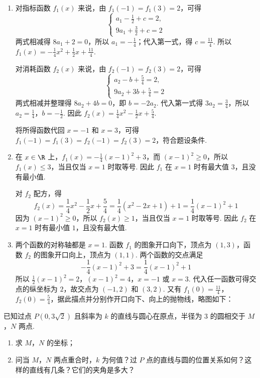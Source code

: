 \begin{solution}
\begin{enumerate}
\item 对指标函数 \( f_1(x) \) 来说，由 \( f_1(-1)=f_1(3)=2 \)，可得
\[
\begin{cases}
a_1-\frac{1}{2}+c=2,\\
9a_1+\frac{3}{2}+c=2
\end{cases}
\]
两式相减得 \(8a_1+2=0\)，所以 \(a_1=-\frac14\)；代入第一式，得 \(c=\frac{11}{4}\). 所以
\(f_1(x)=-\frac14x^2+\frac12x+\frac{11}{4}\).

对消耗函数 \( f_2(x) \) 来说，由 \( f_2(-1)=f_2(3)=2 \)，可得
\[
\begin{cases}
a_2-b+\frac{5}{4}=2,\\
9a_2+3b+\frac{5}{4}=2
\end{cases}
\]
两式相减并整理得 \(8a_2+4b=0\)，即 \(b=-2a_2\). 代入第一式得 \(3a_2=\frac34\)，所以 \(a_2=\frac14\)，\(b=-\frac12\). 因此
\(f_2(x)=\frac14x^2-\frac12x+\frac54\).

将所得函数代回 \(x=-1\) 和 \(x=3\)，可得
\(f_1(-1)=f_1(3)=f_2(-1)=f_2(3)=2\)，符合题设条件.

\item 在 \(x\in\R\) 上，\(f_1(x)=-\frac14(x-1)^2+3\)，而 \((x-1)^2\geq0\)，所以 \(f_1(x)\leq3\)，当且仅当 \(x=1\) 时取等号. 因此 \(f_1\) 在 \(x=1\) 时有最大值 \(3\)，且没有最小值.

对 \(f_2\) 配方，得
\[
f_2(x)=\frac14x^2-\frac12x+\frac54
=\frac14\left(x^2-2x+1\right)+1
=\frac14(x-1)^2+1
\]
因为 \((x-1)^2\geq0\)，所以 \(f_2(x)\geq1\)，当且仅当 \(x=1\) 时取等号. 因此 \(f_2\) 在 \(x=1\) 时有最小值 \(1\)，且没有最大值.

\item 两个函数的对称轴都是 \(x=1\). 函数 \(f_1\) 的图象开口向下，顶点为 \((1,3)\)，函数 \(f_2\) 的图象开口向上，顶点为 \((1,1)\). 两个函数的交点满足
\[
-\frac14(x-1)^2+3=\frac14(x-1)^2+1
\]
所以
\(\frac12(x-1)^2=2\)，\((x-1)^2=4\)，\(x=-1\text{ 或 }x=3\).
代入任一函数可得交点的纵坐标为 \(2\)，故交点为 \((-1,2)\) 和 \((3,2)\). 又有
\(f_1(0)=\frac{11}{4}\)，\(f_2(0)=\frac54\)，据此描点并分别作开口向下、向上的抛物线，略图如下：

\end{enumerate}
\end{solution}

\begin{problem}
已知过点 \( P\left( 0,3\sqrt{2} \right) \) 且斜率为 \( k \) 的直线与圆心在原点，半径为 \( 3 \) 的圆相交于 \(M\)，\(N\) 两点.

\begin{enumerate}
\item 求 \(M\)，\(N\) 的坐标；
\setcounter{enumi}{2}
\item 问当 \(M\)，\(N\) 两点重合时，\( k \) 为何值？过 \(P\) 点的直线与圆的位置关系如何？这样的直线有几条？它们的夹角是多大？
\end{enumerate}
\end{problem}

